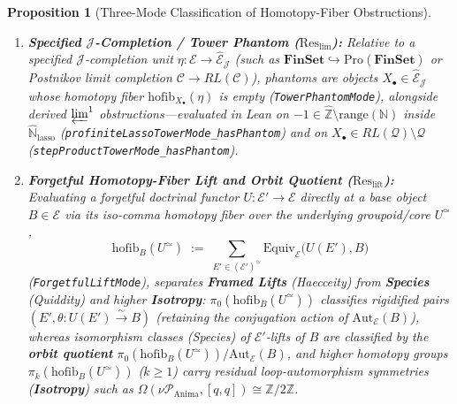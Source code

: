 \documentclass[10pt,twoside,openright]{book}
\theoremstyle{crmplain}
\newtheorem{proposition}[theorem]{Proposition}
\theoremstyle{crmdef}
\theoremstyle{crmremark}
\begin{document}
\begin{proposition}[Three-Mode Classification of Homotopy-Fiber Obstructions]
\begin{enumerate}[label=\textbf{Mode~(\roman*).},leftmargin=4.2em]
\begin{itemize}[leftmargin=1.2em,noitemsep,topsep=2pt]
  \end{itemize}
  Furthermore, $(-1)$-connected inhabitation is strictly weaker than $(-2)$-contractibility: for $q : \mathbb{Z} \twoheadrightarrow \mathbb{Z}/2\mathbb{Z}$, the set-level section space is non-trivial (\texttt{intToZMod2TypeMode\_\allowbreak sectionSpace\_\allowbreak nontrivial}) and therefore inhabited yet not contractible (\texttt{not\_\allowbreak intToZMod2TypeMode\_\allowbreak contractible}), whereas its abelian group section fiber is empty (\texttt{isEmpty\_\allowbreak intToZMod2AbMode\_\allowbreak sectionSpace}).
  \item \textbf{Specified $\mathcal{J}$-Completion / Tower Phantom ($\mathrm{Res}_{\mathrm{lim}}$):} Relative to a specified $\mathcal{J}$-completion unit $\eta : \mathcal{E} \to \widehat{\mathcal{E}}_{\mathcal{J}}$ (such as $\mathbf{FinSet} \hookrightarrow \mathrm{Pro}(\mathbf{FinSet})$ or Postnikov limit completion $\mathcal{C} \to RL(\mathcal{C})$), \emph{phantoms} are objects $X_\bullet \in \widehat{\mathcal{E}}_{\mathcal{J}}$ whose homotopy fiber $\mathrm{hofib}_{X_\bullet}(\eta)$ is empty (\texttt{TowerPhantomMode}), alongside derived $\varprojlim^1$ obstructions---evaluated in Lean on $-1 \in \widehat{\mathbb{Z}} \setminus \mathrm{range}(\mathbb{N})$ inside $\widehat{\mathbb{N}}_{\mathrm{lasso}}$ (\texttt{profiniteLassoTowerMode\_\allowbreak hasPhantom}) and on $X_\bullet \in RL(\mathcal{Q}) \setminus \mathcal{Q}$ (\texttt{stepProductTowerMode\_\allowbreak hasPhantom}).
  \item \textbf{Forgetful Homotopy-Fiber Lift and Orbit Quotient ($\mathrm{Res}_{\mathrm{lift}}$):} Evaluating a forgetful doctrinal functor $U : \mathcal{E}' \to \mathcal{E}$ directly at a \emph{base} object $B \in \mathcal{E}$ via its iso-comma homotopy fiber over the underlying groupoid/core $U^{\simeq}$,
  \[
    \mathrm{hofib}_B(U^{\simeq}) \;:=\; \sum_{E' \in (\mathcal{E}')^{\simeq}} \mathrm{Equiv}_{\mathcal{E}}\bigl(U(E'), B\bigr)
  \]
  (\texttt{ForgetfulLiftMode}), separates \textbf{Framed Lifts} (\emph{Haecceity}) from \textbf{Species} (\emph{Quiddity}) and higher \textbf{Isotropy}: $\pi_0(\mathrm{hofib}_B(U^{\simeq}))$ classifies rigidified pairs $(E', \theta : U(E') \xrightarrow{\sim} B)$ (retaining the conjugation action of $\mathrm{Aut}_{\mathcal{E}}(B)$), whereas isomorphism classes (\emph{Species}) of $\mathcal{E}'$-lifts of $B$ are classified by the \textbf{orbit quotient} $\pi_0(\mathrm{hofib}_B(U^{\simeq})) / \mathrm{Aut}_{\mathcal{E}}(B)$, and higher homotopy groups $\pi_k(\mathrm{hofib}_B(U^{\simeq}))$ ($k \ge 1$) carry residual loop-automorphism symmetries (\textbf{Isotropy}) such as $\Omega(\nu\mathcal{P}_{\mathrm{Anima}}, [q,q]) \cong \mathbb{Z}/2\mathbb{Z}$.
\end{enumerate}
\end{proposition}
\end{document}
